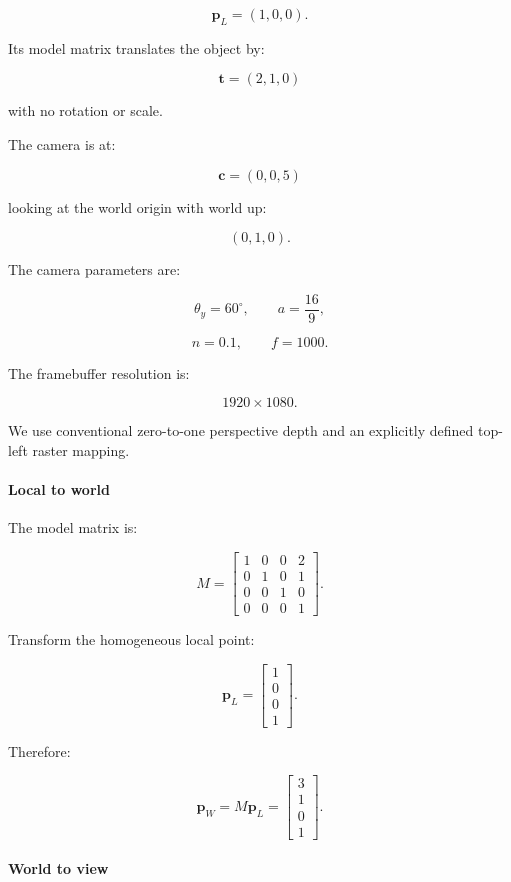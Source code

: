 \[
 \boxed{ \mathbf p_L=(1,0,0) }.
\]

Its model matrix translates the object by:

\[
 \mathbf t=(2,1,0)
\]

with no rotation or scale.

The camera is at:

\[
 \mathbf c=(0,0,5)
\]

looking at the world origin with world up:

\[
 (0,1,0).
\]

The camera parameters are:

\[
 \theta_y=60^\circ, \qquad a=\frac{16}{9},
\]

\[
 n=0.1,\qquad f=1000.
\]

The framebuffer resolution is:

\[
 1920\times1080.
\]

We use conventional zero-to-one perspective depth and an explicitly defined top-left raster mapping.

\paragraph{Local to world}\label{local-to-world}

The model matrix is:

\[
 M= \begin{bmatrix} 1&0&0&2\\ 0&1&0&1\\ 0&0&1&0\\ 0&0&0&1 \end{bmatrix}.
\]

Transform the homogeneous local point:

\[
 \mathbf p_L= \begin{bmatrix} 1\\0\\0\\1 \end{bmatrix}.
\]

Therefore:

\[
 \boxed{ \mathbf p_W= M\mathbf p_L= \begin{bmatrix} 3\\1\\0\\1 \end{bmatrix} }.
\]

\paragraph{World to view}\label{world-to-view}


